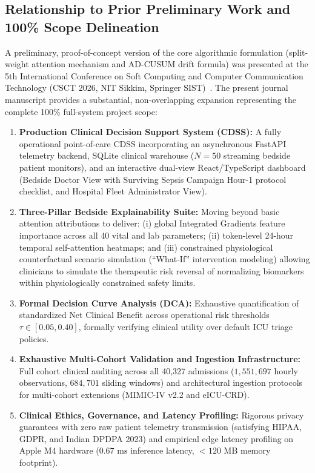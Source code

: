\documentclass[journal,twocolumn,10pt]{IEEEtran}
\begin{document}
\subsection{Relationship to Prior Preliminary Work and 100\% Scope Delineation}
A preliminary, proof-of-concept version of the core algorithmic formulation (split-weight attention mechanism and AD-CUSUM drift formula) was presented at the 5th International Conference on Soft Computing and Computer Communication Technology (CSCT 2026, NIT Sikkim, Springer SIST)~\cite{sakhi2026drift}. The present journal manuscript provides a substantial, non-overlapping expansion representing the complete 100\% full-system project scope:
\begin{enumerate}
    \item \textbf{Production Clinical Decision Support System (CDSS):} A fully operational point-of-care CDSS incorporating an asynchronous FastAPI telemetry backend, SQLite clinical warehouse ($N = 50$ streaming bedside patient monitors), and an interactive dual-view React/TypeScript dashboard (Bedside Doctor View with Surviving Sepsis Campaign Hour-1 protocol checklist, and Hospital Fleet Administrator View).
    \item \textbf{Three-Pillar Bedside Explainability Suite:} Moving beyond basic attention attributions to deliver: (i) global Integrated Gradients feature importance across all 40 vital and lab parameters; (ii) token-level 24-hour temporal self-attention heatmaps; and (iii) constrained physiological counterfactual scenario simulation (``What-If'' intervention modeling) allowing clinicians to simulate the therapeutic risk reversal of normalizing biomarkers within physiologically constrained safety limits.
    \item \textbf{Formal Decision Curve Analysis (DCA):} Exhaustive quantification of standardized Net Clinical Benefit across operational risk thresholds $\tau \in [0.05, 0.40]$, formally verifying clinical utility over default ICU triage policies.
    \item \textbf{Exhaustive Multi-Cohort Validation and Ingestion Infrastructure:} Full cohort clinical auditing across all 40,327 admissions ($1,551,697$ hourly observations, $684,701$ sliding windows) and architectural ingestion protocols for multi-cohort extensions (MIMIC-IV v2.2 and eICU-CRD).
    \item \textbf{Clinical Ethics, Governance, and Latency Profiling:} Rigorous privacy guarantees with zero raw patient telemetry transmission (satisfying HIPAA, GDPR, and Indian DPDPA 2023) and empirical edge latency profiling on Apple M4 hardware ($0.67\text{ ms}$ inference latency, $< 120\text{ MB}$ memory footprint).
\end{enumerate}
\end{document}
